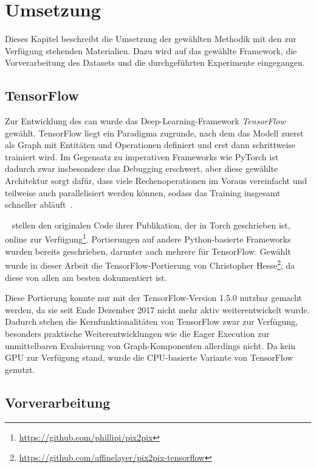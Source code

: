 \chapter{Umsetzung}

Dieses Kapitel beschreibt die Umsetzung der gewählten Methodik mit den zur Verfügung stehenden Materialien.
Dazu wird auf das gewählte Framework, die Vorverarbeitung des Datasets und die durchgeführten Experimente eingegangen.



\section{TensorFlow}

Zur Entwicklung des \gls{can} wurde das Deep-Learning-Framework \emph{TensorFlow}~\cite{Abadi.2016} gewählt.
TensorFlow liegt ein Paradigma zugrunde, nach dem das Modell zuerst als Graph mit Entitäten und Operationen definiert und erst dann schrittweise trainiert wird.
Im Gegensatz zu imperativen Frameworks wie PyTorch ist dadurch zwar insbesondere das Debugging erschwert, aber diese gewählte Architektur sorgt dafür, dass viele Rechenoperationen im Voraus vereinfacht und teilweise auch parallelisiert werden können, sodass das Training insgesamt schneller abläuft~\cite{Goodfellow.2016}.

\citeauthor{Isola.2017}~\cite{Isola.2017} stellen den originalen Code ihrer Publikation, der in Torch geschrieben ist, online zur Verfügung\footnote{\url{https://github.com/phillipi/pix2pix}}.
Portierungen auf andere Python-basierte Frameworks wurden bereits geschrieben, darunter auch mehrere für TensorFlow.
Gewählt wurde in dieser Arbeit die TensorFlow-Portierung von Christopher Hesse\footnote{\url{https://github.com/affinelayer/pix2pix-tensorflow}}, da diese von allen am besten dokumentiert ist.

Diese Portierung konnte nur mit der TensorFlow-Version 1.5.0 nutzbar gemacht werden, da sie seit Ende Dezember 2017 nicht mehr aktiv weiterentwickelt wurde.
Dadurch stehen die Kernfunktionalitäten von TensorFlow zwar zur Verfügung, besonders praktische Weiterentwicklungen wie die Eager Execution zur unmittelbaren Evaluierung von Graph-Komponenten allerdings nicht.
Da kein GPU zur Verfügung stand, wurde die CPU-basierte Variante von TensorFlow genutzt.



\section{Vorverarbeitung}

